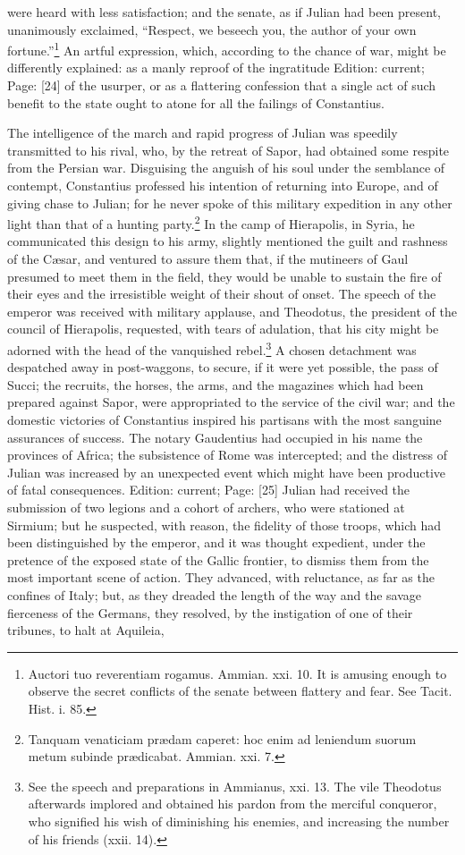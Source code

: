 were heard with less satisfaction; and the senate, as if Julian had been present, unanimously exclaimed, \texthebrew{“}Respect, we beseech you, the author of your own fortune.\texthebrew{}”\footnote{Auctori tuo reverentiam rogamus. Ammian. xxi. 10. It is amusing enough to observe the secret conflicts of the senate between flattery and fear. See Tacit. Hist. i. 85.} An artful expression, which, according to the chance of war, might be differently explained: as a manly reproof of the ingratitude Edition: current; Page: [24] of the usurper, or as a flattering confession that a single act of such benefit to the state ought to atone for all the failings of Constantius.

The intelligence of the march and rapid progress of Julian was speedily transmitted to his rival, who, by the retreat of Sapor, had obtained some respite from the Persian war. Disguising the anguish of his soul under the semblance of contempt, Constantius professed his intention of returning into Europe, and of giving chase to Julian; for he never spoke of this military expedition in any other light than that of a hunting party.\footnote{Tanquam venaticiam prædam caperet: hoc enim ad leniendum suorum metum subinde prædicabat. Ammian. xxi. 7.} In the camp of Hierapolis, in Syria, he communicated this design to his army, slightly mentioned the guilt and rashness of the Cæsar, and ventured to assure them that, if the mutineers of Gaul presumed to meet them in the field, they would be unable to sustain the fire of their eyes and the irresistible weight of their shout of onset. The speech of the emperor was received with military applause, and Theodotus, the president of the council of Hierapolis, requested, with tears of adulation, that his city might be adorned with the head of the vanquished rebel.\footnote{See the speech and preparations in Ammianus, xxi. 13. The vile Theodotus afterwards implored and obtained his pardon from the merciful conqueror, who signified his wish of diminishing his enemies, and increasing the number of his friends (xxii. 14).} A chosen detachment was despatched away in post-waggons, to secure, if it were yet possible, the pass of Succi; the recruits, the horses, the arms, and the magazines which had been prepared against Sapor, were appropriated to the service of the civil war; and the domestic victories of Constantius inspired his partisans with the most sanguine assurances of success. The notary Gaudentius had occupied in his name the provinces of Africa; the subsistence of Rome was intercepted; and the distress of Julian was increased by an unexpected event which might have been productive of fatal consequences. Edition: current; Page: [25] Julian had received the submission of two legions and a cohort of archers, who were stationed at Sirmium; but he suspected, with reason, the fidelity of those troops, which had been distinguished by the emperor, and it was thought expedient, under the pretence of the exposed state of the Gallic frontier, to dismiss them from the most important scene of action. They advanced, with reluctance, as far as the confines of Italy; but, as they dreaded the length of the way and the savage fierceness of the Germans, they resolved, by the instigation of one of their tribunes, to halt at Aquileia, 